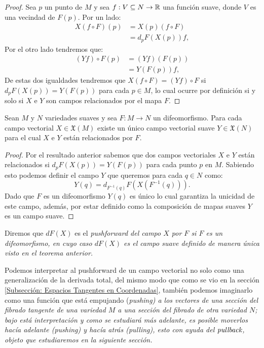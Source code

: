 \begin{proof}
	Sea $p$ un punto de $M$ y sea $f: V \subseteq N \to \R$ una función suave, donde $V$ es una vecindad de $F(p)$. Por un lado:
	\begin{align*}
		X(f \circ F)(p) & = X(p)(f \circ F) \\
		                & = d_pF(X(p))f,
	\end{align*}
	Por el otro lado tendremos que:
	\begin{align*}
		(Yf) \circ F(p) & = (Yf)(F(p)) \\
		                & = Y(F(p))f,
	\end{align*}
	De estas dos igualdades tendremos que $X(f \circ F) = (Yf)\circ F$ si $d_pF(X(p)) = Y(F(p))$ para cada $p \in M$, lo cual ocurre por definición si y solo si $X$ e $Y$ son campos relacionados por el mapa $F$.
\end{proof}

\begin{theorem}
	Sean $M$ y $N$ variedades suaves y sea $F: M \to N$ un difeomorfismo. Para cada campo vectorial $X \in \mathfrak{X}(M)$ existe un único campo vectorial suave $Y \in \mathfrak{X}(N)$ para el cual $X$ e $Y$ están relacionados por $F$.
\end{theorem}

\begin{proof}
	Por el resultado anterior sabemos que dos campos vectoriales $X$ e $Y$ están relacionados si $d_p F(X(p))= Y(F(p))$ para cada punto $p$ en $M$. Sabiendo esto podemos definir el campo $Y$ que queremos para cada $q \in N$ como:
	\[
		Y(q) = d_{F^{-1}(q)} F ( X (F^{-1}(q))).
	\]
	Dado que $F$ es un difeomorfismo $Y(q)$ es único lo cual garantiza la unicidad de este campo, además, por estar definido como la composición de mapas suaves $Y$ es un campo suave.
\end{proof}

\begin{definition}
  Diremos que $dF(X)$ es el \it{pushforward del campo $X$ por $F$} si $F$ es un difeomorfismo, en cuyo caso $dF(X)$ es el campo suave definido de manera única visto en el teorema anterior.
\end{definition}

Podemos interpretar al pushforward de un campo vectorial no solo como una generalización de la derivada total, del mismo modo que como se vio en la sección \ref{Subsección: Espacios Tangentes en Coordenadas}, también podemos imaginarlo como una función que está empujando (\it{pushing}) a los vectores de una sección del fibrado tangente de una variedad $M$ a una sección del fibrado de otra variedad $N$; bajo está interpretación y como se estudiará más adelante, es posible moverlos hacía adelante (\it{pushing}) y hacía atrás (\it{pulling}), esto con ayuda del $\it{pullback}$, objeto que estudiaremos en la siguiente sección.
